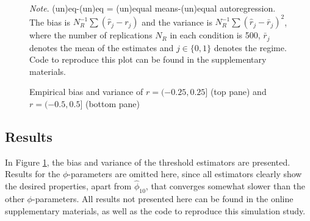 \documentclass{article}
\begin{document}
\begin{figure}
\caption{Empirical bias and variance of $r = (-0.25, 0.25]$ (top pane) and $r = (-0.5, 0.5]$ (bottom pane)}
\begin{center}
\end{center}
\bigskip
\textit{Note}. (un)eq-(un)eq = (un)equal means-(un)equal autoregression. The bias is $N_R^{-1} \sum (\hat{r}_j - r_j)$ and the variance is $N_R^{-1} \sum (\hat{r}_j - \bar{r}_j)^2$, where the number of replications $N_R$ in each condition is 500, $\bar{r}_j$ denotes the mean of the estimates and $j \in \{0, 1\}$ denotes the regime. Code to reproduce this plot can be found in the supplementary materials.
\label{fig:simulation_study_2_results}
\end{figure}

\subsection{Results}
In Figure \ref{fig:simulation_study_2_results}, the bias and variance of the threshold estimators are presented.
Results for the $\phi$-parameters are omitted here, since all estimators clearly show the desired properties, apart from $\hat{\phi}_{10}$, that converges somewhat slower than the other $\phi$-parameters. 
All results not presented here can be found in the online supplementary materials, as well as the code to reproduce this simulation study.
\end{document}
